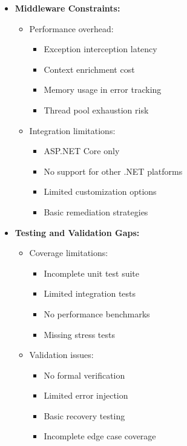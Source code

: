\begin{itemize}
    \item \textbf{Middleware Constraints:}
    \begin{itemize}
        \item Performance overhead:
        \begin{itemize}
            \item Exception interception latency
            \item Context enrichment cost
            \item Memory usage in error tracking
            \item Thread pool exhaustion risk
        \end{itemize}
        \item Integration limitations:
        \begin{itemize}
            \item ASP.NET Core only
            \item No support for other .NET platforms
            \item Limited customization options
            \item Basic remediation strategies
        \end{itemize}
    \end{itemize}

    \item \textbf{Testing and Validation Gaps:}
    \begin{itemize}
        \item Coverage limitations:
        \begin{itemize}
            \item Incomplete unit test suite
            \item Limited integration tests
            \item No performance benchmarks
            \item Missing stress tests
        \end{itemize}
        \item Validation issues:
        \begin{itemize}
            \item No formal verification
            \item Limited error injection
            \item Basic recovery testing
            \item Incomplete edge case coverage
        \end{itemize}
    \end{itemize}
\end{itemize}

